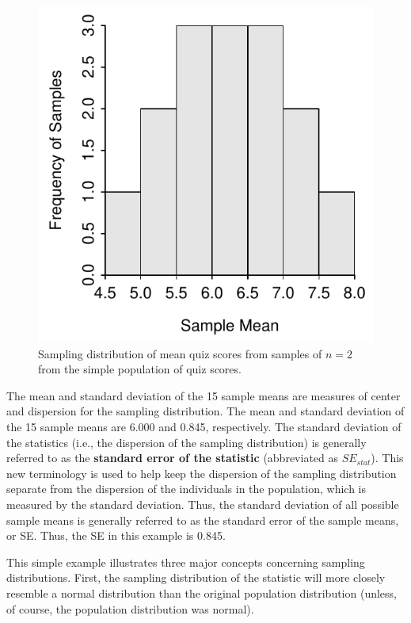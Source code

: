 \documentclass[10pt,openany]{book}\usepackage[]{graphicx}\usepackage[]{color}
\newenvironment{knitrout}{}{} %
\begin{document}
\begin{knitrout}
\color{fgcolor}\begin{figure}[hbtp]

{\centering \includegraphics[width=.4\linewidth]{Figs/SDistQuiz2-1} 

}

\caption[Sampling distribution of mean quiz scores from samples of $n=2$ from the simple population of quiz scores]{Sampling distribution of mean quiz scores from samples of $n=2$ from the simple population of quiz scores.}\label{fig:SDistQuiz2}
\end{figure}


\end{knitrout}

\vspace{24pt}
The mean and standard deviation of the 15 sample means are measures of center and dispersion for the sampling distribution.  The mean and standard deviation of the 15 sample means are 6.000 and 0.845, respectively.  The standard deviation of the statistics (i.e., the dispersion of the sampling distribution) is generally referred to as the \textbf{standard error of the statistic} (abbreviated as $SE_{stat}$).  This new terminology is used to help keep the dispersion of the sampling distribution separate from the dispersion of the individuals in the population, which is measured by the standard deviation.  Thus, the standard deviation of all possible sample means is generally referred to as the standard error of the sample means, or SE.  Thus, the SE in this example is 0.845.


This simple example illustrates three major concepts concerning sampling distributions.  First, the sampling distribution of the statistic will more closely resemble a normal distribution than the original population distribution (unless, of course, the population distribution was normal).
\end{document}
